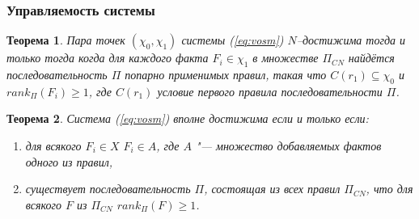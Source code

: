 \documentclass[default]{beamer}
\newtheorem{Theorem}{Теорема}
\begin{document}
	\begin{frame}
		\frametitle{Управляемость системы}
		
		\begin{Theorem}
			Пара точек $(\chi_0, \chi_1)$ системы (\ref{eq:vosm})  $N$–достижима тогда и только тогда когда для каждого факта $F_i\in\chi_1$ в множестве $\Pi_{CN}$ найдётся последовательность $\Pi$ попарно применимых правил, такая что $C(r_1)\subseteq\chi_0$ и $rank_{\Pi}(F_i)\geqslant 1$, где $C(r_1)$ условие первого правила последовательности $\Pi$.
		\end{Theorem}
		
		\begin{Theorem}
			Система (\ref*{eq:vosm})  вполне достижима если и только если: 
			\begin{enumerate}
				\item для всякого $F_i\in X$ $F_i\in A$, где $A$ "--- множество добавляемых фактов одного из правил,
				\item существует последовательность $\Pi$, состоящая из всех правил $\Pi_{CN}$, что для всякого $F$ из $\Pi_{CN}$ $rank_{\Pi}(F)\geqslant 1$.
			\end{enumerate}
		\end{Theorem}
	\end{frame}
			
	
\end{document}
